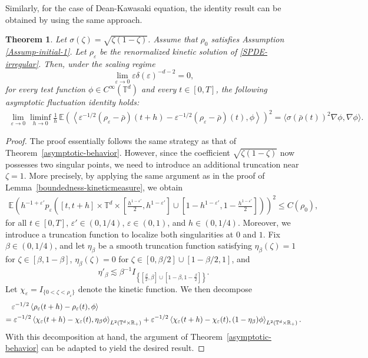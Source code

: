 \documentclass[UTF-8,reqno]{amsart}
\numberwithin{equation}{section}
\newtheorem{theorem}{Theorem}[section]
\def\leq{\leqslant}
\def\leq{\leqslant}
\begin{document}
Similarly, for the case of Dean-Kawasaki equation, the identity result can be obtained by using the same approach.
\begin{theorem}
Let $\sigma(\zeta)=\sqrt{\zeta(1-\zeta)}$. Assume that $\rho_0$ satisfies Assumption \ref{Assump-initial-1}. Let $\rho_{\varepsilon}$ be the renormalized kinetic solution of \eqref{SPDE-irregular}. Then, under the scaling regime $$\lim_{\varepsilon\rightarrow0}\varepsilon\delta(\varepsilon)^{-d-2}=0,$$ for every test function $\phi \in C^{\infty}(\mathbb{T}^d)$ and every $t \in [0,T]$, the following asymptotic fluctuation identity holds:
\begin{align*}
	\lim_{\varepsilon \to 0} \liminf_{h \to 0} \frac{1}{h} \, \mathbb{E} \left( \left\langle \varepsilon^{-1/2}(\rho_{\varepsilon} - \bar{\rho})(t + h) - \varepsilon^{-1/2}(\rho_{\varepsilon} - \bar{\rho})(t), \phi \right\rangle \right)^2 = \langle \sigma(\bar{\rho}(t))^2 \nabla \phi, \nabla \phi \rangle.
\end{align*}
\end{theorem}
\begin{proof}
	The proof essentially follows the same strategy as that of Theorem~\ref{asymptotic-behavior}. However, since the coefficient $\sqrt{\zeta(1-\zeta)}$ now possesses two singular points, we need to introduce an additional truncation near $\zeta = 1$. More precisely, by applying the same argument as in the proof of Lemma~\ref{boundedness-kineticmeasure}, we obtain
\begin{align*}
\mathbb{E}\left(h^{-1 + \varepsilon'} 
p_{\varepsilon}\!\left([t, t + h] \times \mathbb{T}^d \times 
\left[\tfrac{h^{1 - \varepsilon'}}{2}, h^{1 - \varepsilon'}\right]
\cup
\left[1-h^{1 - \varepsilon'}, 1-\tfrac{h^{1 - \varepsilon'}}{2}\right]
\right)\right)^2 
\leq C(\rho_0),
\end{align*}
for all $t \in [0, T]$, $\varepsilon' \in (0, 1/4)$, $\varepsilon \in (0, 1)$, and $h \in (0, 1/4)$. Moreover, we introduce a truncation function to localize both singularities at $0$ and $1$. Fix $\beta \in (0, 1/4)$, and let $\eta_{\beta}$ be a smooth truncation function satisfying $\eta_{\beta}(\zeta) = 1$ for $\zeta \in [\beta,1-\beta]$, $\eta_{\beta}(\zeta) = 0$ for $\zeta \in [0,\beta/2] \cup [1-\beta/2,1]$, and 
$$
\eta'_{\beta} \lesssim \beta^{-1} I_{\left\{[\tfrac{\beta}{2}, \beta]\cup[1-\beta,1-\tfrac{\beta}{2}]\right\}}.
$$
Let $\chi_{\varepsilon} = I_{\{0 < \zeta < \rho_{\varepsilon}\}}$ denote the kinetic function. We then decompose
\begin{align*}
&\varepsilon^{-1/2} \left\langle \rho_{\varepsilon}(t + h) - \rho_{\varepsilon}(t), \phi \right\rangle \notag\\
=&\; \varepsilon^{-1/2} \left\langle \chi_{\varepsilon}(t + h) - \chi_{\varepsilon}(t), \eta_{\beta} \phi \right\rangle_{L^2(\mathbb{T}^d\times\mathbb{R}_+)}
+ \varepsilon^{-1/2} \left\langle \chi_{\varepsilon}(t + h) - \chi_{\varepsilon}(t), (1 - \eta_{\beta}) \phi \right\rangle_{L^2(\mathbb{T}^d\times\mathbb{R}_+)}.
\end{align*}
With this decomposition at hand, the argument of Theorem~\ref{asymptotic-behavior} can be adapted to yield the desired result.


\end{proof}
\end{document}
